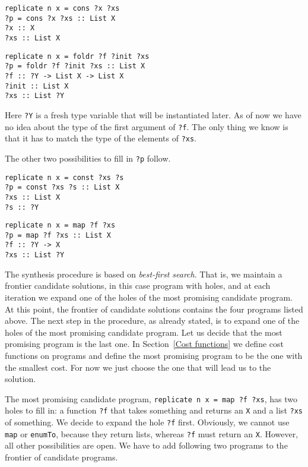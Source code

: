 \begin{lstlisting}[style=plain]
replicate n x = cons ?x ?xs
?p = cons ?x ?xs :: List X
?x :: X
?xs :: List X
\end{lstlisting}

\begin{lstlisting}[style=plain]
replicate n x = foldr ?f ?init ?xs
?p = foldr ?f ?init ?xs :: List X
?f :: ?Y -> List X -> List X
?init :: List X
?xs :: List ?Y
\end{lstlisting}
Here \lstinline!?Y! is a fresh type variable that will be instantiated later. As of now we have no idea about the type of the first argument of \lstinline!?f!. The only thing we know is that it has to match the type of the elements of \lstinline!?xs!.

The other two possibilities to fill in \lstinline!?p! follow.

\begin{lstlisting}[style=plain]
replicate n x = const ?xs ?s
?p = const ?xs ?s :: List X
?xs :: List X
?s :: ?Y
\end{lstlisting}

\begin{lstlisting}[style=plain]
replicate n x = map ?f ?xs
?p = map ?f ?xs :: List X
?f :: ?Y -> X
?xs :: List ?Y
\end{lstlisting}

The synthesis procedure is based on \emph{best-first search}. That is, we maintain a frontier candidate solutions, in this case program with holes, and at each iteration we expand one of the holes of the most promising candidate program. At this point, the frontier of candidate solutions contains the four programs listed above.
The next step in the procedure, as already stated, is to expand one of the holes of the most promising candidate program.
Let us decide that the most promising program is the last one. In Section~\ref{Cost functions} we define cost functions on programs and define the most promising program to be the one with the smallest cost. For now we just choose the one that will lead us to the solution.

The most promising candidate program, \lstinline!replicate n x = map ?f ?xs!, has two holes to fill in: a function \lstinline!?f! that takes something and returns an \lstinline?X? and a list \lstinline!?xs! of something. We decide to expand the hole \lstinline!?f! first. Obviously, we cannot use \lstinline?map? or \lstinline?enumTo?, because they return lists, whereas \lstinline!?f! must return an \lstinline!X!. However, all other possibilities are open. We have to add following two programs to the frontier of candidate programs.

